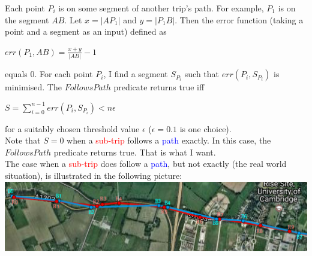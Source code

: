 \documentclass[12pt,a4paper,oneside,openright]{report}
\begin{document}
Each point $P_i$ is on some segment of another trip's path.
For example, $P_1$ is on the segment $AB$.
Let $x = |AP_1|$ and $y = |P_1B|$. Then the
error function (taking a point and a segment as an input) defined as \\

\begin{centering}
$err(P_1, AB) = \frac{x + y}{|AB|} - 1$ \\
\end{centering}

\:
\:
\:

equals $0$. For each point $P_i$, I find a segment $S_{P_i}$ such that
$err(P_i, S_{P_i})$ is minimised. The $FollowsPath$ predicate returns true
iff

\begin{centering}
    $S = \sum_{i=0}^{n-1} err(P_i, S_{P_i}) < n\epsilon$ \\
\end{centering}

\:
\:
\:

for a suitably chosen threshold value $\epsilon$ ($\epsilon = 0.1$ is one choice). \\

Note that $S = 0$ when a \textcolor{red}{sub-trip} follows a
\textcolor{blue}{path} exactly. In this case, the $FollowsPath$ predicate returns true.
That is what I want. \\

The case when a \textcolor{red}{sub-trip} does follow a
\textcolor{blue}{path}, but not exactly (the real world situation), 
is illustrated in the following picture: \\

\includegraphics[width=\textwidth]{figs/follows_roughly.png}
\end{document}
